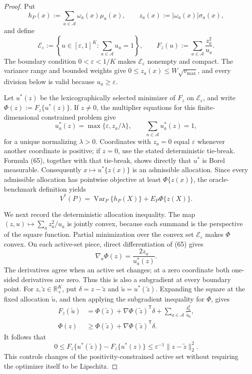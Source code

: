 \documentclass{article}
\begin{document}
\begin{proof}
Put
\[
h_P(x):=\sum_{a\in\mathcal A}\omega_a(x)\mu_a(x),
\qquad
z_a(x):=|\omega_a(x)|\sigma_a(x),
\]
and define
\[
\mathcal E_{\varepsilon}:=
\left\{u\in[\varepsilon,1]^K:\sum_{a\in\mathcal A}u_a=1\right\},
\qquad
F_z(u):=\sum_{a\in\mathcal A}\frac{z_a^2}{u_a}.
\tag{64}
\]
The boundary condition \(0<\varepsilon<1/K\) makes \(\mathcal E_{\varepsilon}\) nonempty and compact. The variance range and bounded weights give \(0\leq z_a(x)\leq W\sqrt{v_{\max}}\), and every division below is valid because \(u_a\geq\varepsilon\).

Let \(u^*(z)\) be the lexicographically selected minimizer of \(F_z\) on \(\mathcal E_{\varepsilon}\), and write \(\Phi(z):=F_z\{u^*(z)\}\). If \(z\neq0\), the multiplier equations for this finite-dimensional constrained problem give
\[
u_a^*(z)=\max\{\varepsilon,z_a/\lambda\},
\qquad
\sum_{a\in\mathcal A}u_a^*(z)=1,
\tag{65}
\]
for a unique normalizing \(\lambda>0\). Coordinates with \(z_a=0\) equal \(\varepsilon\) whenever another coordinate is positive; if \(z=0\), use the stated deterministic tie-break. Formula (65), together with that tie-break, shows directly that \(u^*\) is Borel measurable. Consequently \(x\mapsto u^*\{z(x)\}\) is an admissible allocation. Since every admissible allocation has pointwise objective at least \(\Phi\{z(x)\}\), the oracle-benchmark definition yields
\[
V^*(P)=\operatorname{Var}_P\{h_P(X)\}+E_P\Phi\{z(X)\}.
\tag{66}
\]

We next record the deterministic allocation inequality. The map \((z,u)\mapsto\sum_a z_a^2/u_a\) is jointly convex, because each summand is the perspective of the square function. Partial minimization over the convex set \(\mathcal E_{\varepsilon}\) makes \(\Phi\) convex. On each active-set piece, direct differentiation of (65) gives
\[
\nabla_a\Phi(z)=\frac{2z_a}{u_a^*(z)}.
\]
The derivatives agree when an active set changes; at a zero coordinate both one-sided derivatives are zero. Thus this is also a subgradient at every boundary point. For \(z,\widetilde z\in\mathbb R_+^K\), put \(\delta=z-\widetilde z\) and \(\widetilde u=u^*(\widetilde z)\). Expanding the square at the fixed allocation \(\widetilde u\), and then applying the subgradient inequality for \(\Phi\), gives
\[
\begin{aligned}
F_z(\widetilde u)
&=\Phi(\widetilde z)+\nabla\Phi(\widetilde z)^{\mathsf T}\delta
+\sum_{a\in\mathcal A}\frac{\delta_a^2}{\widetilde u_a},\\
\Phi(z)&\geq
\Phi(\widetilde z)+\nabla\Phi(\widetilde z)^{\mathsf T}\delta.
\end{aligned}
\]
It follows that
\[
0\leq F_z\{u^*(\widetilde z)\}-F_z\{u^*(z)\}
\leq\varepsilon^{-1}\|z-\widetilde z\|_2^2.
\tag{67}
\]
This controls changes of the positivity-constrained active set without requiring the optimizer itself to be Lipschitz.


\end{proof}
\end{document}
